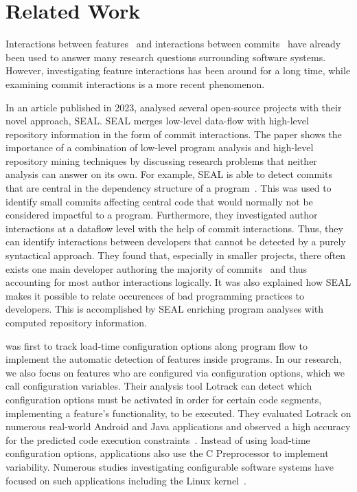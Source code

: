 \chapter{Related Work}\label{ch:related_work}

Interactions between features~\cite{lillack2014tracking,kolesnikov2017relation} and interactions between commits~\cite{sattler2023seal} have already been used to answer many research questions surrounding software systems.
However, investigating feature interactions has been around for a long time, while examining commit interactions is a more recent phenomenon. 

In an article published in 2023, \citet{sattler2023seal} analysed several open-source projects with their novel approach, SEAL.
SEAL merges low-level data-flow with high-level repository information in the form of commit interactions.
The paper shows the importance of a combination of low-level program analysis and high-level repository mining techniques by discussing research problems that neither analysis can answer on its own.
For example, SEAL is able to detect commits that are central in the dependency structure of a program~\cite{sattler2023seal}.
This was used to identify small commits affecting central code that would normally not be considered impactful to a program.
Furthermore, they investigated author interactions at a dataflow level with the help of commit interactions.
Thus, they can identify interactions between developers that cannot be detected by a purely syntactical approach.
They found that, especially in smaller projects, there often exists one main developer authoring the majority of commits~\cite{sattler2023seal} and thus accounting for most author interactions logically. 
It was also explained how SEAL makes it possible to relate occurences of bad programming practices to developers. 
This is accomplished by SEAL enriching program analyses with computed repository information. 

\citet{lillack2014tracking} was first to track load-time configuration options along program flow to implement the automatic detection of features inside programs.
In our research, we also focus on features who are configured via configuration options, which we call configuration variables. 
Their analysis tool Lotrack can detect which configuration options must be activated in order for certain code segments, implementing a feature's functionality, to be executed.
They evaluated Lotrack on numerous real-world Android and Java applications and observed a high accuracy for the predicted code execution constraints~\cite{lillack2014tracking}.
Instead of using load-time configuration options, applications also use the C Preprocessor to implement variability.
Numerous studies investigating configurable software systems have focused on such applications including the Linux kernel~\cite{passos2021scattering,michelon2021lifecycle,kolesnikov2017relation}.

